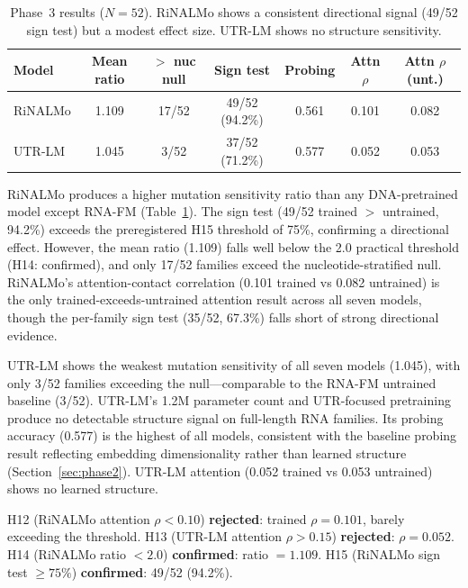 \documentclass[11pt]{article}
\begin{document}
\begin{table}[t]
\centering
\caption{Phase~3 results ($N = 52$).  RiNALMo shows a consistent
  directional signal (49/52 sign test) but a modest effect size.
  UTR-LM shows no structure sensitivity.}
\label{tab:phase3}
\begin{tabular}{@{}lcccccc@{}}
\toprule
\textbf{Model} & \textbf{Mean ratio} & \textbf{$>$ nuc null} &
  \textbf{Sign test} & \textbf{Probing} &
  \textbf{Attn $\rho$} & \textbf{Attn $\rho$ (unt.)} \\
\midrule
RiNALMo & 1.109 & 17/52 & 49/52 (94.2\%) & 0.561 & 0.101 & 0.082 \\
UTR-LM  & 1.045 & 3/52  & 37/52 (71.2\%) & 0.577 & 0.052 & 0.053 \\
\bottomrule
\end{tabular}
\end{table}

RiNALMo produces a higher mutation sensitivity ratio than any
DNA-pretrained model except RNA-FM (Table~\ref{tab:phase3}).  The
sign test (49/52 trained $>$ untrained, 94.2\%) exceeds the
preregistered H15 threshold of 75\%, confirming a directional effect.
However, the mean ratio (1.109) falls well below the 2.0 practical
threshold (H14: confirmed), and only 17/52 families exceed the
nucleotide-stratified null.  RiNALMo's attention-contact correlation
(0.101 trained vs 0.082 untrained) is the only trained-exceeds-untrained
attention result across all seven models, though the per-family sign
test (35/52, 67.3\%) falls short of strong directional evidence.

UTR-LM shows the weakest mutation sensitivity of all seven models
(1.045), with only 3/52 families exceeding the null---comparable to
the RNA-FM untrained baseline (3/52).  UTR-LM's 1.2M parameter count
and UTR-focused pretraining produce no detectable structure signal on
full-length RNA families.  Its probing accuracy (0.577) is the highest
of all models, consistent with the baseline probing result reflecting
embedding dimensionality rather than learned structure
(Section~\ref{sec:phase2}).  UTR-LM attention (0.052 trained vs 0.053
untrained) shows no learned structure.

H12 (RiNALMo attention $\rho < 0.10$) \textbf{rejected}: trained
$\rho = 0.101$, barely exceeding the threshold.  H13 (UTR-LM
attention $\rho > 0.15$) \textbf{rejected}: $\rho = 0.052$.  H14
(RiNALMo ratio $< 2.0$) \textbf{confirmed}: ratio $= 1.109$.  H15
(RiNALMo sign test $\geq 75\%$) \textbf{confirmed}: 49/52 (94.2\%).
\end{document}
